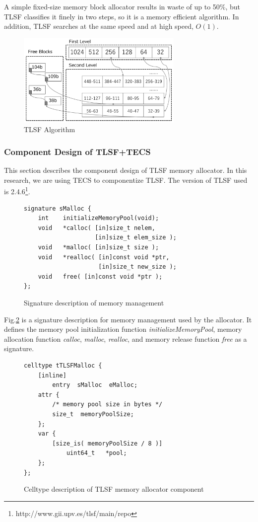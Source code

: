 \documentclass[JIP]{ipsj_v2/UTF8/ipsj}
\begin{document}
A simple fixed-size memory block allocator results in waste of up to 50\%, but TLSF classifies it finely in two steps, so it is a memory efficient algorithm.
In addition, TLSF searches at the same speed and at high speed, $O(1)$.


\begin{figure}[t]
    \centering
    \includegraphics[width=8cm,clip]{figure/TLSF.pdf}
    \caption{TLSF Algorithm}
    \label{fig:TLSF}
\end{figure}


\subsubsection{Component Design of TLSF+TECS}

This section describes the component design of TLSF memory allocator.
In this research, we are using TECS to componentize TLSF.
The version of TLSF used is 2.4.6\footnote{http://www.gii.upv.es/tlsf/main/repo}.

\begin{figure}[t]
\centering
\begin{lstlisting}
signature sMalloc {
    int    initializeMemoryPool(void);
    void   *calloc( [in]size_t nelem,
                    [in]size_t elem_size );
    void   *malloc( [in]size_t size );
    void   *realloc( [in]const void *ptr,
                     [in]size_t new_size );
    void   free( [in]const void *ptr );
};
\end{lstlisting}
\caption{Signature description of memory management}  
\label{src:TLSFSignature}
\end{figure}

Fig.\ref{src:TLSFSignature} is a signature description for memory management used by the allocator.
It defines the memory pool initialization function {\it initializeMemoryPool}, memory allocation function {\it calloc}, {\it malloc}, {\it realloc}, and memory release function {\it free} as a signature.

\begin{figure}[t]
\centering
\begin{lstlisting}
celltype tTLSFMalloc {
    [inline]
        entry  sMalloc  eMalloc;
    attr {
        /* memory pool size in bytes */
        size_t  memoryPoolSize;
    };
    var {
        [size_is( memoryPoolSize / 8 )]
            uint64_t   *pool;
    };
};
\end{lstlisting}
\caption{Celltype description of TLSF memory allocator component}  
\label{src:TLSFCelltype}
\end{figure}
\end{document}
